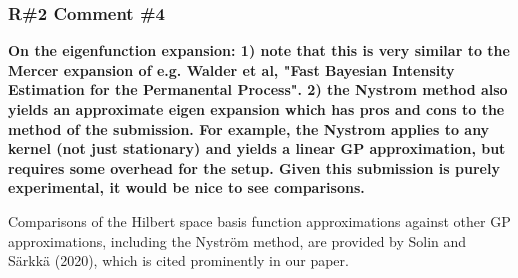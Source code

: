 \documentclass[11pt]{report}
\begin{document}
\subsubsection*{R\#2 Comment \#4}

\textbf{On the eigenfunction expansion: 1) note that this is very similar to the Mercer expansion of e.g. Walder et al, "Fast Bayesian Intensity Estimation for the Permanental Process". 2) the Nystrom method also yields an approximate eigen expansion which has pros and cons to the method of the submission. For example, the Nystrom applies to any kernel (not just stationary) and yields a linear GP approximation, but requires some overhead for the setup. Given this submission is purely experimental, it would be nice to see comparisons.} 

Comparisons of the Hilbert space basis function approximations against other GP approximations, including the Nyström method, are provided by Solin and Särkkä (2020), which is cited prominently in our paper.




\end{document}
